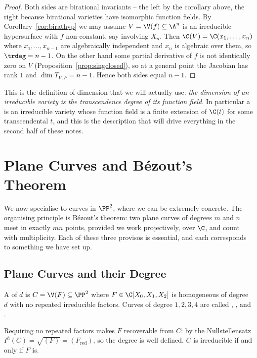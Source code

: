 \begin{proof}
	Both sides are birational invariants -- the left by the corollary above, the right because birational varieties have isomorphic function fields. By Corollary~\ref{cor:birathyp} we may assume $V = \V(f) \subseteq \A^{n}$ is an irreducible hypersurface with $f$ non-constant, say involving $X_n$. Then $\C(V) = \C(x_1,\dots,x_n)$ where $x_1,\dots,x_{n-1}$ are algebraically independent and $x_n$ is algebraic over them, so $\trdeg = n-1$. On the other hand some partial derivative of $f$ is not identically zero on $V$ (Proposition~\ref{prop:singclosed}), so at a general point the Jacobian has rank $1$ and $\dim T_{V,P} = n-1$. Hence both sides equal $n-1$.
\end{proof}

This is the definition of dimension that we will actually use: \emph{the dimension of an irreducible variety is the transcendence degree of its function field}. In particular a  is an irreducible variety whose function field is a finite extension of $\C(t)$ for some transcendental $t$, and this is the description that will drive everything in the second half of these notes.

\section{Plane Curves and B\'ezout's Theorem}

We now specialise to curves in $\PP^2$, where we can be extremely concrete. The organising principle is B\'ezout's theorem: two plane curves of degrees $m$ and $n$ meet in exactly $mn$ points, provided we work projectively, over $\C$, and count with multiplicity. Each of these three provisos is essential, and each corresponds to something we have set up.

\subsection{Plane Curves and their Degree}

\begin{definition}
	A  of  $d$ is $C = \V(F) \subseteq \PP^2$ where $F \in \C[X_0,X_1,X_2]$ is homogeneous of degree $d$ with no repeated irreducible factors. Curves of degree $1,2,3,4$ are called , ,  and .
\end{definition}

Requiring no repeated factors makes $F$ recoverable from $C$: by the Nullstellensatz $I^h(C) = \sqrt{(F)} = (F_{\mathrm{red}})$, so the degree is well defined. $C$ is irreducible if and only if $F$ is.

